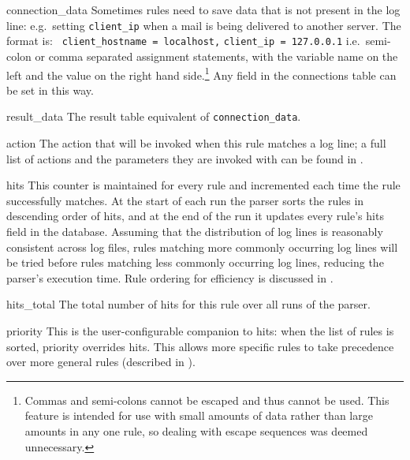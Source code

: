 \begin{eqlist}
    \item [connection\_data] Sometimes rules need to save data that is not
        present in the log line: e.g.\ setting \texttt{client\_ip} when a
        mail is being delivered to another server.  The format is:
        \newline{} \tab{} \texttt{ client\_hostname = localhost,}
        \newline{} \tab{} \tab{} \texttt{client\_ip
        = 127.0.0.1} \newline{} i.e.\ semi-colon or comma separated
        assignment statements, with the variable name on the left and the
        value on the right hand side.\footnote{Commas and semi-colons
        cannot be escaped and thus cannot be used.  This feature is
        intended for use with small amounts of data rather than large
        amounts in any one rule, so dealing with escape sequences was
        deemed unnecessary.}  Any field in the connections table can be set
        in this way.

    \item [result\_data] The result table equivalent of
        \texttt{connection\_data}.

    \item [action] The action that will be invoked when this rule matches a
        log line; a full list of actions and the parameters they are
        invoked with can be found in .

    \item [hits] This counter is maintained for every rule and incremented
        each time the rule successfully matches.  At the start of each run
        the parser sorts the rules in descending order of hits, and at the
        end of the run it updates every rule's hits field in the database.
        Assuming that the distribution of log lines is reasonably
        consistent across log files, rules matching more commonly occurring
        log lines will be tried before rules matching less commonly
        occurring log lines, reducing the parser's execution time.  Rule
        ordering for efficiency is discussed in .

    \item [hits\_total] The total number of hits for this rule over all
        runs of the parser.

    \item [priority] This is the user-configurable companion to hits: when
        the list of rules is sorted, priority overrides hits.  This allows
        more specific rules to take precedence over more general rules
        (described in ).


\end{eqlist}


